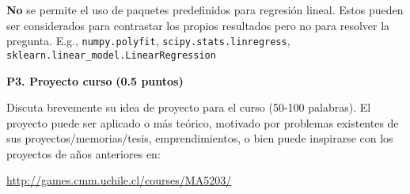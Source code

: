 \documentclass[11pt,letterpaper]{article}
\begin{document}
 \textbf{No} se permite el uso de paquetes predefinidos para regresión lineal. Estos pueden ser considerados para contrastar los propios resultados pero no para resolver la pregunta. E.g., \texttt{numpy.polyfit},  \texttt{scipy.stats.linregress}, \texttt{sklearn.linear\_model.LinearRegression}

\vspace{5 mm}
\noindent\textbf{P3. Proyecto curso} \textbf{(0.5 puntos)}
\vspace{5 mm}

Discuta brevemente su idea de proyecto para el curso (50-100 palabras). El proyecto puede ser aplicado o más teórico, motivado por problemas existentes de sus proyectos/memorias/tesis, emprendimientos, o bien puede inspirarse con los proyectos de años anteriores en:

\vspace{1em}
\centerline{\url{http://games.cmm.uchile.cl/courses/MA5203/}}
\vspace{1em}


\vspace{2em}
\end{document}
